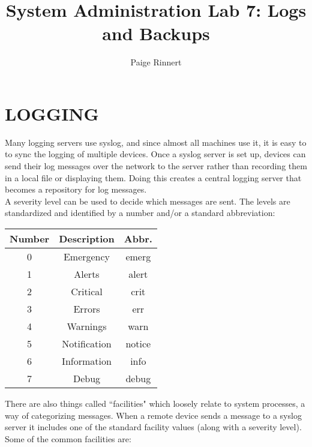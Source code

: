 \documentclass{article}
\title{System Administration Lab 7: Logs and Backups\vspace{-2ex}}
\author{Paige Rinnert}
\date{}
\begin{document}
\maketitle



\section*{LOGGING}

\indent\indent Many logging servers use syslog, and since almost all machines use it, it is easy to to sync the logging of multiple devices. Once a syslog server is set up, devices can send their log messages over the network to the server rather than recording them in a local file or displaying them. Doing this creates a central logging server that becomes a repository for log messages. \\

A severity level can be used to decide which messages are sent. The levels are standardized and identified by a number and/or a standard abbreviation:

\begin{center}
\begin{tabular}{|c|c|c|}
\hline
Number & Description & Abbr. \\
\hline
\hline
0 & Emergency & emerg \\
\hline
1 & Alerts & alert \\
\hline
2 & Critical & crit \\
\hline
3 & Errors & err \\
\hline
4 & Warnings & warn \\
\hline
5 & Notification & notice \\
\hline
6 & Information & info \\
\hline
7 & Debug & debug \\
\hline
\end{tabular}
\end{center}

There are also things called ``facilities" which loosely relate to system processes, a way of categorizing messages. When a remote device sends a message to a syslog server it includes one of the standard facility values (along with a severity level). Some of the common facilities are:
\end{document}
